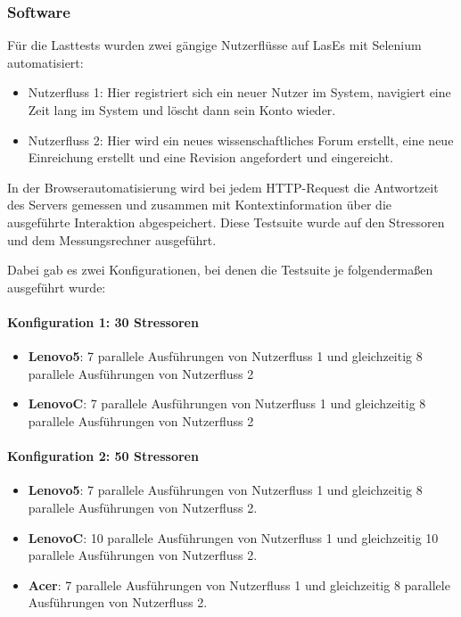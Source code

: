 \subsubsection{Software}

Für die Lasttests wurden zwei gängige Nutzerflüsse auf LasEs mit Selenium automatisiert:
\begin{itemize}
	\item Nutzerfluss 1: Hier registriert sich ein neuer Nutzer im System, navigiert eine Zeit lang im System und löscht dann sein Konto wieder.
	\item Nutzerfluss 2: Hier wird ein neues wissenschaftliches Forum erstellt, eine neue Einreichung erstellt und eine Revision angefordert und eingereicht.
\end{itemize}
In der Browserautomatisierung wird bei jedem HTTP-Request die Antwortzeit des Servers gemessen und zusammen mit Kontextinformation über die ausgeführte Interaktion abgespeichert. Diese Testsuite wurde auf den Stressoren und dem Messungsrechner ausgeführt.

Dabei gab es zwei Konfigurationen, bei denen die Testsuite je folgendermaßen ausgeführt wurde:

\paragraph{Konfiguration 1: 30 Stressoren}
\begin{itemize}
	\item \textbf{Lenovo5}: 7 parallele Ausführungen von Nutzerfluss 1 und gleichzeitig 8 parallele Ausführungen von Nutzerfluss 2
	\item \textbf{LenovoC}: 7 parallele Ausführungen von Nutzerfluss 1 und gleichzeitig 8 parallele Ausführungen von Nutzerfluss 2
\end{itemize}

\paragraph{Konfiguration 2: 50 Stressoren}
\begin{itemize}
	\item \textbf{Lenovo5}: 7 parallele Ausführungen von Nutzerfluss 1 und gleichzeitig 8 parallele Ausführungen von Nutzerfluss 2.
	\item \textbf{LenovoC}: 10 parallele Ausführungen von Nutzerfluss 1 und gleichzeitig 10 parallele Ausführungen von Nutzerfluss 2.
	\item \textbf{Acer}: 7 parallele Ausführungen von Nutzerfluss 1 und gleichzeitig 8 parallele Ausführungen von Nutzerfluss 2.
\end{itemize}


